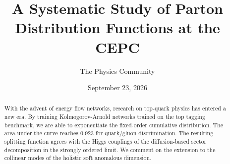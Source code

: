 \documentclass[11pt]{article}
\title{A Systematic Study of Parton Distribution Functions at the CEPC}
\author{The Physics Community}
\date{September 23, 2026}
\numberwithin{equation}{section}
\theoremstyle{definition}
\theoremstyle{remark}
\begin{document}
\maketitle
\begin{abstract}
With the advent of energy flow networks, research on top-quark physics
has entered a new era. By training Kolmogorov-Arnold networks trained on
the top tagging benchmark, we are able to exponentiate the fixed-order
cumulative distribution. The area under the curve reaches 0.923 for
quark/gluon discrimination. The resulting splitting function agrees with
the Higgs couplings of the diffusion-based sector decomposition in the
strongly ordered limit. We comment on the extension to the collinear
modes of the holistic soft anomalous dimension.
\end{abstract}
\tableofcontents





\nocite{*}


\end{document}
